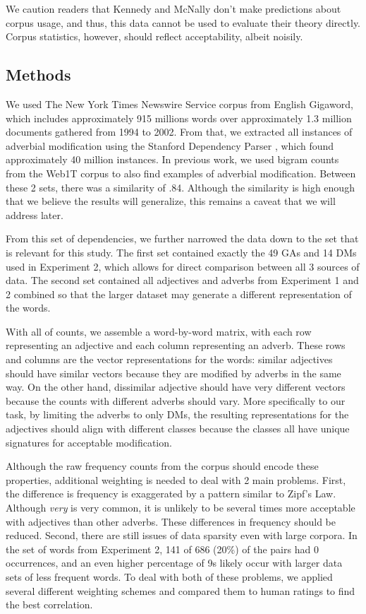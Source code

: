 \documentclass[11pt]{article}
\begin{document}
We caution readers that Kennedy and McNally  don't make predictions about corpus usage, and thus, this data cannot be used to evaluate their theory directly. Corpus statistics, however, should reflect acceptability, albeit noisily. 

\subsection{Methods}
We used The New York Times Newswire Service corpus from English Gigaword, which includes approximately 915 millions words over approximately 1.3 million documents gathered from 1994 to 2002. From that, we extracted all instances of adverbial modification using the Stanford Dependency Parser \cite{marneffe}, which found approximately 40 million instances. In previous work, we used bigram counts from the Web1T corpus to also find examples of adverbial modification. Between these 2 sets, there was a similarity of .84. Although the similarity is high enough that we believe the results will generalize, this remains a caveat that we will address later.

From this set of dependencies, we further narrowed the data down to the set that is relevant for this study. The first set contained exactly the 49 GAs and 14 DMs used in Experiment 2, which allows for direct comparison between all 3 sources of data. The second set contained all adjectives and adverbs from Experiment 1 and 2 combined so that the larger dataset may generate a different representation of the words.

With all of counts, we assemble a word-by-word matrix, with each row representing an adjective and each column representing an adverb. These rows and columns are the vector representations for the words: similar adjectives should have similar vectors because they are modified by adverbs in the same way. On the other hand, dissimilar adjective should have very different vectors because the counts with different adverbs should vary. More specifically to our task, by limiting the adverbs to only DMs, the resulting representations for the adjectives should align with different classes because the classes all have unique signatures for acceptable modification.

Although the raw frequency counts from the corpus should encode these properties, additional weighting is needed to deal with 2 main problems. First, the difference is frequency is exaggerated by a pattern similar to Zipf's Law. Although \textit{very} is very common, it is unlikely to be several times more acceptable with adjectives than other adverbs. These differences in frequency should be reduced. Second, there are still issues of data sparsity even with large corpora. In the set of words from Experiment 2, 141 of 686 (20\%) of the pairs had 0 occurrences, and an even higher percentage of 9s likely occur with larger data sets of less frequent words. To deal with both of these problems, we applied several different weighting schemes and compared them to human ratings to find the best correlation.
\end{document}
